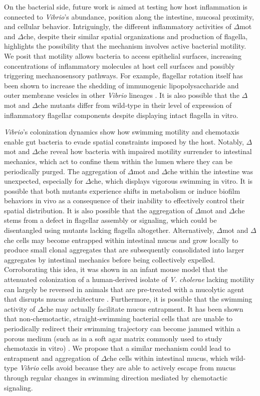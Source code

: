 On the bacterial side, future work is aimed at testing how host inflammation is connected to \textit{Vibrio}'s abundance, position along the intestine, mucosal proximity, and cellular behavior. Intriguingly, the different inflammatory activities of $\Delta$mot and $\Delta$che, despite their similar spatial organizations and production of flagella, highlights the possibility that the mechanism involves active bacterial motility. We posit that motility allows bacteria to access epithelial surfaces, increasing concentrations of inflammatory molecules at host cell surfaces and possibly triggering mechanosensory pathways. For example, flagellar rotation itself has been shown to increase the shedding of immunogenic lipopolysaccharide and outer membrane vesicles in other \textit{Vibrio} lineages \cite{brennan_model_2014,aschtgen_rotation_2016}. It is also possible that the $\Delta$mot and $\Delta$che mutants differ from wild-type in their level of expression of inflammatory flagellar components despite displaying intact flagella in vitro. 

\textit{Vibrio}'s colonization dynamics show how swimming motility and chemotaxis enable gut bacteria to evade spatial constraints imposed by the host. Notably, $\Delta$mot and $\Delta$che reveal how bacteria with impaired motility surrender to intestinal mechanics, which act to confine them within the lumen where they can be periodically purged. The aggregation of $\Delta$mot and $\Delta$che within the intestine was unexpected, especially for $\Delta$che, which displays vigorous swimming in vitro. It is possible that both mutants experience shifts in metabolism or induce biofilm behaviors in vivo as a consequence of their inability to effectively control their spatial distribution. It is also possible that the aggregation of $\Delta$mot and $\Delta$che stems from a defect in flagellar assembly or signaling, which could be disentangled using mutants lacking flagella altogether. Alternatively, $\Delta$mot and $\Delta$che cells may become entrapped within intestinal mucus and grow locally to produce small clonal aggregates that are subsequently consolidated into larger aggregates by intestinal mechanics before being collectively expelled. Corroborating this idea, it was shown in an infant mouse model that the attenuated colonization of a human-derived isolate of \textit{V. }\textit{cholerae} lacking motility can largely be reversed in animals that are pre-treated with a mucolytic agent that disrupts mucus architecture \cite{millet_insights_2014}. Furthermore, it is possible that the swimming activity of $\Delta$che may actually facilitate mucus entrapment. It has been shown that non-chemotactic, straight-swimming bacterial cells that are unable to periodically redirect their swimming trajectory can become jammed within a porous medium (such as in a soft agar matrix commonly used to study chemotaxis in vitro) \cite{licata_diffusion_2016}. We propose that a similar mechanism could lead to entrapment and aggregation of $\Delta$che cells within intestinal mucus, which wild-type \textit{Vibrio} cells avoid because they are able to actively escape from mucus through regular changes in swimming direction mediated by chemotactic signaling.

